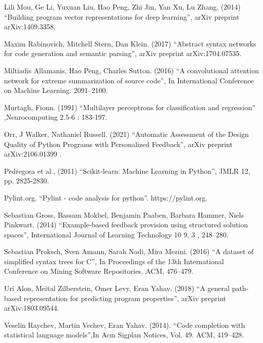 \documentclass[a4paper, 14pt, oneside]{Thesis}
\begin{document}
\begin{thebibliography}{99}
 Lili Mou, Ge Li, Yuxuan Liu, Hao Peng, Zhi
  Jin, Yan Xu, Lu Zhang. (2014) ``Building program vector
  representations for deep learning'', arXiv preprint
  arXiv:1409.3358.

 Maxim Rabinovich, Mitchell Stern, Dan
  Klein. (2017) ``Abstract syntax networks for code
  generation and semantic parsing'', arXiv preprint
  arXiv:1704.07535.

 Miltiadis Allamanis, Hao Peng, Charles
  Sutton. (2016) ``A convolutional attention network for
  extreme summarization of source code'', In International
  Conference on Machine Learning. 2091–2100.

 Murtagh, Fionn. (1991) ``Multilayer
  perceptrons for classification and regression''
  ,Neurocomputing 2.5-6 : 183-197.

Orr, J Walker, Nathaniel Russell. (2021)
  ``Automatic Assessment of the Design Quality of Python
  Programs with Personalized Feedback'', arXiv preprint
  arXiv:2106.01399 .

 Pedregosa et al., (2011) ``Scikit-learn:
  Machine Learning in Python'', JMLR 12, pp. 2825-2830.

 Pylint.org. ``Pylint - code analysis for
  python''. https://pylint.org.

 Sebastian Gross, Bassam Mokbel, Benjamin
  Paaben, Barbara Hammer, Niels Pinkwart. (2014)
  ``Example-based feedback provision using structured
  solution spaces'', International Journal of Learning
  Technology 10 9, 3 , 248–280.

 Sebastian Proksch, Sven Amann, Sarah Nadi,
  Mira Mezini. (2016) ``A dataset of simplified syntax trees
  for C'', In Proceedings of the 13th International
  Conference on Mining Software Repositories. ACM, 476–479.

 Uri Alon, Meital Zilberstein, Omer Levy, Eran
  Yahav. (2018) ``A general path-based representation for
  predicting program properties'', arXiv preprint
  arXiv:1803.09544.

 Veselin Raychev, Martin Vechev, Eran
  Yahav. (2014). ``Code completion with statistical language
  models'',In Acm Sigplan Notices, Vol. 49. ACM, 419–428.

\end{thebibliography}
\end{document}
